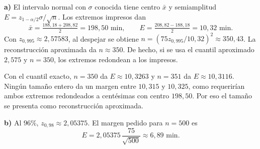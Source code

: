 \textbf{a)} El intervalo normal con $\sigma$ conocida tiene centro $\bar x$ y semiamplitud $E=z_{1-\alpha/2}\sigma/\sqrt n$. Los extremos impresos dan
\[
\bar x=\tfrac{188{,}18+208{,}82}{2}=\boxed{198{,}50\text{ min}},
\qquad E=\tfrac{208{,}82-188{,}18}{2}=10{,}32\text{ min}.
\]
Con $z_{0{,}995}\approx2{,}57583$, al despejar se obtiene $n=(75z_{0{,}995}/10{,}32)^2\approx350{,}43$. La reconstrucción aproximada da $\boxed{n\approx350}$. De hecho, si se usa el cuantil aproximado $2{,}575$ y $n=350$, los extremos redondean a los impresos.

Con el cuantil exacto, $n=350$ da $E\approx10{,}3263$ y $n=351$ da $E\approx10{,}3116$. Ningún tamaño entero da un margen entre $10{,}315$ y $10{,}325$, como requerirían ambos extremos redondeados a centésimas con centro $198{,}50$. Por eso el tamaño se presenta como reconstrucción aproximada.

\textbf{b)} Al $96\%$, $z_{0{,}98}\approx2{,}05375$. El margen pedido para $n=500$ es
\[
E=2{,}05375\,\frac{75}{\sqrt{500}}\approx\boxed{6{,}89\text{ min}}.
\]
